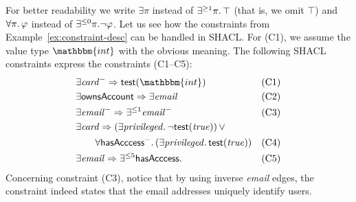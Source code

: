 \begin{example}

For better readability we write $\exists \pi$ instead of $\exists^{\ge 1} \pi
\ldotp \top$ (that is, we omit $\top$) and $\forall \pi \ldotp \varphi$
instead of $\exists^{\leq 0}\pi.{\lnot \varphi}$.
Let us see how the constraints from Example~\ref{ex:constraint-desc} can be
handled in SHACL.
For (C1), we assume the value type $\mathbbm{int}$ with the obvious meaning.
The  following SHACL constraints express the constraints (C1--C5):
\begin{align*}
  & \exists \excard^{-} \Rightarrow \test(\mathbbm{int})
    & \mbox{(C1)} \\
  & \exists \exowns     \Rightarrow \exists \exemail
    & \mbox{(C2)} \\
  & \exists\exemail^{-} \Rightarrow \exists^{\leq 1} \exemail^{-}
    & \mbox{(C3)} \\
  & \exists \excard      \Rightarrow (\exists \exprivileged \ldotp \neg
      \hasvalue(\mathit{true})) \,\lor
    & \\
  & \qquad  \forall \exaccess^{-} \ldotp (\exists \exprivileged \ldotp
      \hasvalue(\mathit{true}))
    & \mbox{(C4)} \\
  & \exists \exemail \Rightarrow \leqn{5}{\exaccess}
    & \mbox{(C5)}
\end{align*}
Concerning constraint (C3), notice that by using inverse \textit{email} edges,
the constraint indeed states that the email addresses uniquely identify users.
\end{example}


